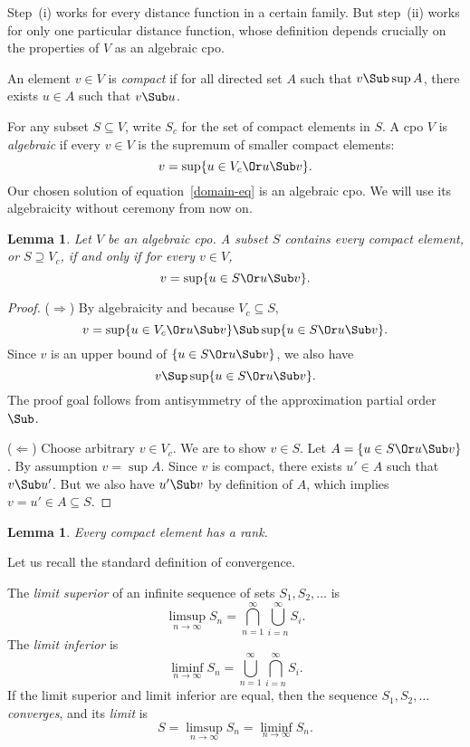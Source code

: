\documentclass{amsart}
\newtheorem{lemma}[subsection]{Lemma}
\begin{document}
Step~(i) works for every distance function in a certain family.
But step~(ii) works for only one particular distance function,
whose definition depends crucially on the properties of $V$ as an
algebraic cpo.


An element $v\in V$ is \emph{compact} if for all directed set $A$
such that $v\Sub\sup A$, there exists $u\in A$ such that $v\Sub
u$.

For any subset $S\subseteq V$, write $S_c$ for the set of compact
elements in $S$. A cpo $V$ is \emph{algebraic} if every $v\in V$
is the supremum of smaller compact elements:
\[
v=\sup \{u \in V_c \Or u \Sub v \}.
\]
Our chosen solution of equation~\eqref{domain-eq} is an algebraic
cpo. We will use its algebraicity without ceremony from now on.

\begin{lemma}
Let $V$ be an algebraic cpo. A subset $S$ contains every compact
element, or $S\supseteq V_c$, if and only if for every $v\in V$,
\[
v=\sup\{u\in S \Or u\Sub v\}.
\]
\end{lemma}

\begin{proof}
($\Rightarrow$) By algebraicity and because $V_c\subseteq S$,
\[
v=\sup\{u\in V_c \Or u \Sub v\} \Sub \sup\{u\in S \Or u \Sub v\}.
\]
Since $v$ is an upper bound of $\{u\in S \Or u \Sub v\}$, we also
have
\[
v\Sup \sup\{u\in S \Or u \Sub v\}.
\]
The proof goal follows from antisymmetry of the approximation
partial order $\Sub$.

($\Leftarrow$) Choose arbitrary $v\in V_c$. We are to show $v\in
S$. Let $A= \{u \in S \Or u \Sub v\}$. By assumption $v=\sup A$.
Since $v$ is compact, there exists $u'\in A$ such that $v\Sub
u'$. But we also have $u'\Sub v$ by definition of $A$, which
implies $v=u'\in A\subseteq S$.
\end{proof}


\begin{lemma}
Every compact element has a rank.
\end{lemma}

Let us recall the standard definition of convergence.

The \emph{limit superior} of an infinite sequence of sets
$S_1,S_2,\ldots$ is
\[
\limsup_{n\rightarrow\infty}S_n =
\bigcap_{n=1}^\infty\bigcup_{i = n}^\infty S_i.
\]
The \emph{limit inferior} is
\[
\liminf_{n\rightarrow\infty}S_n =
\bigcup_{n=1}^\infty\bigcap_{i = n}^\infty S_i.
\]
If the limit superior and limit inferior are equal, then the
sequence $S_1,S_2,\ldots$ \emph{converges}, and its \emph{limit}
is
\[
S = \limsup_{n\rightarrow\infty}S_n = \liminf_{n\rightarrow\infty}S_n.
\]
\end{document}
